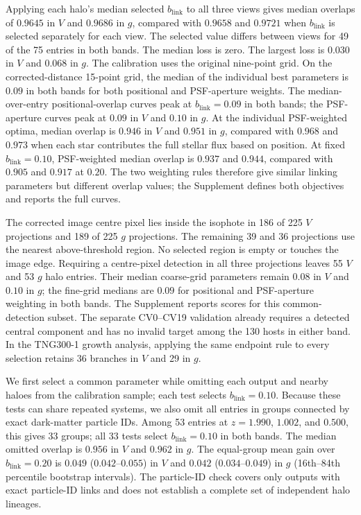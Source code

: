 \documentclass[usenatbib]{mnras}
\begin{document}
Applying each halo's median selected $b_{\mathrm{link}}$ to all three views gives median
overlaps of $0.9645$ in $V$ and $0.9686$ in $g$, compared with
$0.9658$ and $0.9721$ when $b_{\mathrm{link}}$ is selected separately for each view.
The selected value differs between views for 49 of the 75 entries in
both bands. The median loss is zero. The largest loss is $0.030$ in $V$
and $0.068$ in $g$. The calibration uses the original nine-point grid.
On the corrected-distance 15-point grid, the median of the individual
best parameters is $0.09$ in both bands for both positional and
PSF-aperture weights. The median-over-entry positional-overlap curves peak
at $b_{\mathrm{link}}=0.09$ in both bands; the PSF-aperture curves peak
at $0.09$ in $V$ and $0.10$ in $g$. At the individual PSF-weighted
optima, median overlap is $0.946$ in $V$ and $0.951$ in $g$, compared
with $0.968$ and $0.973$ when each star contributes the full stellar flux based
on position. At fixed $b_{\mathrm{link}}=0.10$, PSF-weighted median
overlap is $0.937$ and $0.944$, compared with $0.905$ and $0.917$ at
$0.20$. The two weighting rules therefore give similar linking
parameters but different overlap values; the Supplement defines both
objectives and reports the full curves.

The corrected image centre pixel lies inside the isophote in 186 of 225
$V$ projections and 189 of 225 $g$ projections. The remaining 39 and 36
projections use the nearest above-threshold region. No selected region is
empty or touches the image edge. Requiring a centre-pixel detection in all
three projections leaves 55 $V$ and 53 $g$ halo entries. Their median
coarse-grid parameters remain $0.08$ in $V$ and $0.10$ in $g$; the
fine-grid medians are $0.09$ for positional and PSF-aperture weighting
in both bands. The Supplement reports scores for this common-detection
subset. The
separate CV0--CV19 validation already requires a detected central component
and has no invalid target among the 130 hosts in either band. In the
TNG300-1 growth analysis, applying the same endpoint rule to every
selection retains 36 branches in $V$ and 29 in $g$.

We first select a common parameter while omitting each output and nearby
haloes from the calibration sample; each test selects $b_{\mathrm{link}}=0.10$.
Because these tests can share repeated systems, we also omit all entries
in groups connected by exact dark-matter particle IDs. Among 53 entries
at $z=1.990$, $1.002$, and $0.500$, this gives 33 groups; all 33 tests
select $b_{\mathrm{link}}=0.10$ in both bands. The median omitted overlap is $0.956$ in $V$ and $0.962$ in $g$.
The equal-group mean gain over $b_{\mathrm{link}}=0.20$ is $0.049$ ($0.042$--$0.055$)
in $V$ and $0.042$ ($0.034$--$0.049$) in $g$ (16th--84th percentile
bootstrap intervals). The particle-ID check covers only outputs with exact particle-ID
links and does not establish a complete set of independent halo lineages.
\end{document}
